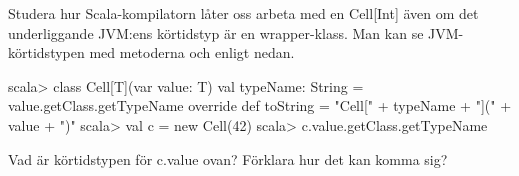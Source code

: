 \Subtask Studera hur Scala-kompilatorn låter oss arbeta med en Cell[Int] även om det underliggande JVM:ens körtidstyp  är en wrapper-klass. Man kan se JVM-körtidstypen med metoderna  och  enligt nedan.
\begin{REPL}
scala> class Cell[T](var value: T){
         val typeName: String = value.getClass.getTypeName
         override def toString = "Cell[" + typeName + "](" + value + ")"
       }
scala> val c = new Cell(42)
scala> c.value.getClass.getTypeName
\end{REPL}

\Subtask Vad är körtidstypen för c.value ovan? Förklara hur det kan komma sig? 


\Subtask 

\ExtraTasks %

\TODO

\Task 

\AdvancedTasks %

\TODO

\Task     
    